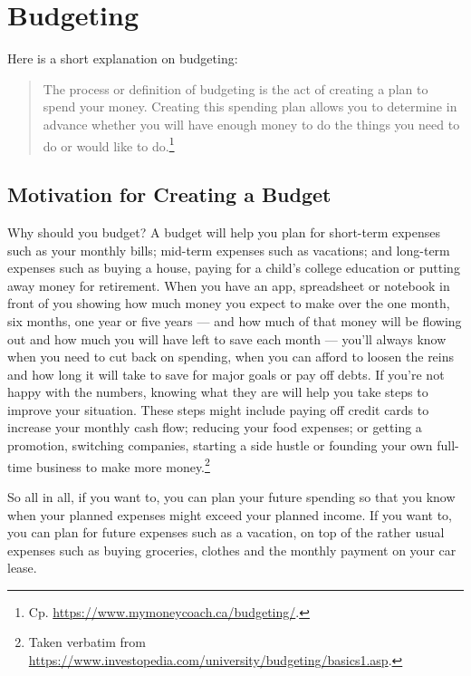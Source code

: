 \section{Budgeting}
\label{sec:budgeting}

Here is a short explanation on budgeting:
\begin{quote}\small
	The process or definition of budgeting is the act of creating a plan to spend your money.
	Creating this spending plan allows you to determine in advance whether you will have enough money to do the things you need to do or would like to do.\footnote{Cp. \url{https://www.mymoneycoach.ca/budgeting/}.}
\end{quote}

\subsection{Motivation for Creating a Budget}
\label{subsec:motivation-creating-budget}

Why should you budget? A budget will help you plan for short-term expenses such as your monthly bills; mid-term expenses such as vacations; and long-term expenses such as buying a house, paying for a child’s college education or putting away money for retirement.
When you have an app, spreadsheet or notebook in front of you showing how much money you expect to make over the one month, six months, one year or five years --- and how much of that money will be flowing out and how much you will have left to save each month --- you’ll always know when you need to cut back on spending, when you can afford to loosen the reins and how long it will take to save for major goals or pay off debts.
If you’re not happy with the numbers, knowing what they are will help you take steps to improve your situation.
These steps might include paying off credit cards to increase your monthly cash flow; reducing your food expenses; or getting a promotion, switching companies, starting a side hustle or founding your own full-time business to make more money.\footnote{Taken verbatim from \url{https://www.investopedia.com/university/budgeting/basics1.asp}.}

So all in all, if you want to, you can plan your future spending so that you know when your planned expenses might exceed your planned income.
If you want to, you can plan for future expenses such as a vacation, on top of the rather usual expenses such as buying groceries, clothes and the monthly payment on your car lease.

